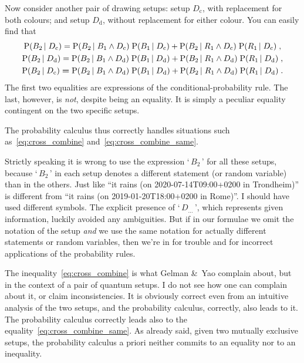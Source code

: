 \documentclass[\ifafour a4paper,12pt,\else a5paper,10pt,\fi%
onecolumn,oneside,article,%
british%
]{memoir}
\newcommand*{\defquote}[1]{`\,#1\,'}
\theoremstyle{remark}
\theoremstyle{innote}
\newcommand*{\citey}{\parencites*}
\newcommand*{\amp}{\&}
\newcommand*{\p}{\mathrm{P}}%
\renewcommand*{\|}[1][]{\nonscript\,#1\vert\nonscript\;\mathopen{}}
\newcommand*{\yDc}{D_{\textrm{c}}}
\newcommand*{\yDd}{D_{\textrm{d}}}
\begin{document}
\medskip

Now consider another pair of drawing setups: setup $\yDc$, with replacement
for both colours; and setup $\yDd$, without replacement for either colour.
You can easily find that
\begin{gather}
  \p(B_{2} \| \yDc) =%
  \p(B_{2} \| B_{1} \land \yDc) \; \p( B_{1} \| \yDc) +
  \p(B_{2} \| R_{1} \land \yDc)  \; \p( R_{1} \| \yDc) \;,
  \\
  \p(B_{2} \| \yDd) =%
  \p(B_{2} \| B_{1} \land \yDd) \; \p( B_{1} \| \yDd) +
  \p(B_{2} \| R_{1} \land \yDd)  \; \p( R_{1} \| \yDd) \;,
  \\
  \label{eq:cross_combine_same}
  \p(B_{2} \| \yDc) \mathrel{\bm{=}}
  \p(B_{2} \| B_{1} \land \yDd) \; \p( B_{1} \| \yDd) +
  \p(B_{2} \| R_{1} \land \yDd)  \; \p( R_{1} \| \yDd) \;.
\end{gather}
The first two equalities are expressions of the conditional-probability
rule. The last, however, is \emph{not}, despite being an equality. It is
simply a peculiar equality contingent on the two specific setups.

The probability calculus thus correctly handles situations such
as~\eqref{eq:cross_combine} and~\eqref{eq:cross_combine_same}.

\medskip

Strictly speaking it is wrong to use the expression \defquote{$B_{2}$} for
all these setups, because \defquote{$B_{2}$} in each setup denotes a
different statement (or random variable) than in the others. Just like
\enquote{it rains (on 2020-07-14T09:00+0200 in Trondheim)} is different
from \enquote{it rains (on 2019-01-20T18:00+0200 in Rome)}. I should have
used different symbols. The explicit presence of \defquote{$D_{\dotso}$},
which represents given information, luckily avoided any ambiguities. But if
in our formulae we omit the notation of the setup \emph{and} we use the
same notation for actually different statements or random variables, then
we're in for trouble and for incorrect applications of the probability
rules.

\medskip

The inequality~\eqref{eq:cross_combine} is what Gelman \amp\ Yao
\citey[p.~2]{gelmanetal2020} complain about, but in the context of a pair
of quantum setups. I do not see how one can complain about it, or claim
inconsistencies. It is obviously correct even from an intuitive analysis of
the two setups, and the probability calculus, correctly, also leads to it.
The probability calculus correctly leads also to the
equality~\eqref{eq:cross_combine_same}. As already said, given two mutually
exclusive setups, the probability calculus a priori neither commits to an
equality nor to an inequality.
\end{document}
